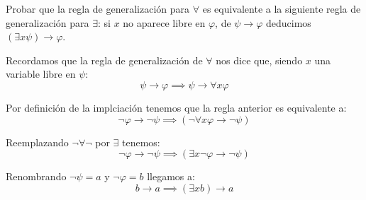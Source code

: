 \begin{problem} Probar que la regla de generalizaci\'on para  $\forall$ es equivalente a la siguiente regla de generalizaci\'on para
$\exists$: si $x$ no aparece libre en $\varphi$, de $\psi \to \varphi$ deducimos $(\exists x \psi) \to \varphi$.

\solution
{}

Recordamos que la regla de generalización de $\forall$ nos dice que, siendo $x$ una variable libre en $\psi$:
\[\psi \to \varphi \implies \psi \to \forall x \varphi\]

Por definición de la implciación tenemos que la regla anterior es equivalente a:
\[\neg \varphi \to \neg \psi \implies (\neg \forall x \varphi \to \neg \psi)\]

Reemplazando $\neg \forall \neg$ por $\exists$ tenemos:
\[\neg \varphi \to \neg \psi  \implies (\exists x \neg \varphi \to \neg \psi)\]

Renombrando $\neg \psi =a $ y $\neg \varphi =b$ llegamos a:
\[b \to a \implies (\exists x b) \to a \]

\end{problem}

